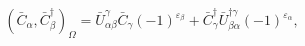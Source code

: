 \begin{equation}\label{5.21a}
(\bar{C}_\alpha,\bar{C}^\dagger_\beta)_\Omega=
\bar{U}^\gamma_{\alpha\beta}\bar{C}_\gamma(-1)^{\varepsilon_\beta}+
\bar{C}^\dagger_\gamma
\bar{U}^{\dagger\gamma}_{\beta\alpha}(-1)^{\varepsilon_\alpha},
\end{equation}

